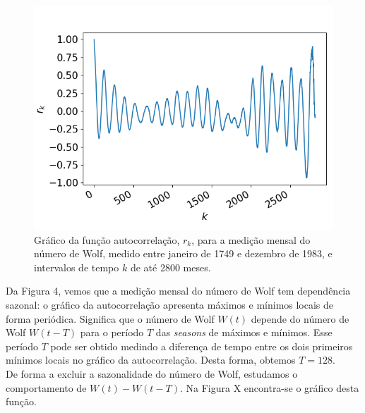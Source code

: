\documentclass[aps,pre,twocolumn,showpacs,amsmath,amssymb]{revtex4-1}
\begin{document}
\begin{figure}[hbt!]
    \centering
    \includegraphics[width=\columnwidth]{autocorrelation.png}
    \caption{Gráfico da função autocorrelação, $r_k$, para a medição mensal do número de Wolf, medido entre janeiro de 1749 e dezembro de 1983, e intervalos de tempo $k$ de até 2800 meses.}
\end{figure}

Da Figura 4, vemos que a medição mensal do número de Wolf tem dependência sazonal: o gráfico da autocorrelação apresenta máximos e mínimos locais de forma periódica. Significa que o número de Wolf $W(t)$ depende do número de Wolf $W(t-T)$ para o período $T$ das \textit{seasons} de máximos e mínimos. Esse período $T$ pode ser obtido medindo a diferença de tempo entre os dois primeiros mínimos locais no gráfico da autocorrelação. Desta forma, obtemos $T=128$.\\
De forma a excluir a sazonalidade do número de Wolf, estudamos o comportamento de $W(t)-W(t-T).$ Na Figura X encontra-se o gráfico desta função.
\end{document}
